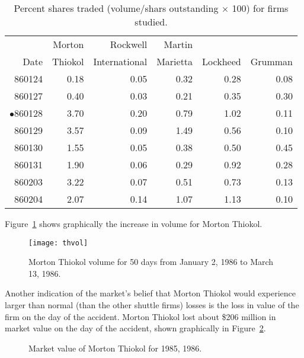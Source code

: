 \begin{table}[h!]
\caption{Percent shares traded (volume/shars outstanding
$\times$ 100) for firms studied.}
\sffamily
\begin{tabular*}{6in}{r@{\extracolsep{1em}}rrrrr}
\hline\hline       
       &  Morton & Rockwell & Martin &          &         \\
Date   &  Thiokol & International & Marietta & Lockheed & Grumman \\
\hline
860124 &   0.18 &   0.05 &   0.32 &   0.28 &   0.08  \\
860127 &   0.40 &   0.03 &   0.21 &   0.35 &   0.30  \\
$\bullet$860128 &   3.70 &   0.20 &   0.79 &   1.02 &   0.11  \\
860129 &   3.57 &   0.09 &   1.49 &   0.56 &   0.10  \\
860130 &   1.55 &   0.05 &   0.38 &   0.50 &   0.45  \\
860131 &   1.90 &   0.06 &   0.29 &   0.92 &   0.28  \\
860203 &   3.22 &   0.07 &   0.51 &   0.73 &   0.13  \\
860204 &   2.07 &   0.14 &   1.07 &   1.13 &   0.10  \\ \hline
\end{tabular*}
\label{percenttraded}
\end{table}

Figure~\ref{thvol} shows graphically the increase in volume
for Morton Thiokol.

\begin{figure}[hp]
\begin{center}
%
\texttt{[image: thvol]}
\end{center}
\caption{Morton Thiokol volume for 50 days from January 2,
1986 to March 13, 1986.}
\label{thvol}
\end{figure}


Another indication of the market's belief that Morton
Thiokol would experience larger than normal (than the other
shuttle firms) losses is the loss in value of the firm on
the day of the accident.
Morton Thiokol lost about \$206 million in market value on
the day of the accident, shown graphically in
Figure~\ref{thval}.

\begin{figure}[hp]
\begin{center}

\end{center}
\caption{Market value of Morton Thiokol for 1985, 1986.}
\label{thval}
\end{figure}

